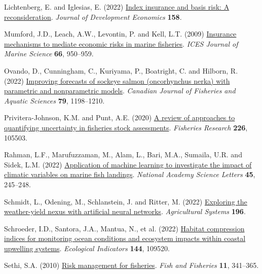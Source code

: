 \documentclass[
  letterpaper,
  DIV=11,
  numbers=noendperiod]{scrartcl}
\newlength{\cslhangindent}
\newlength{\cslentryspacingunit} %
\newenvironment{CSLReferences}[2] %
 {%
  \setlength{\parindent}{0pt}
  \ifodd #1
  \let\oldpar\par
  \def\par{\hangindent=\cslhangindent\oldpar}
  \fi
  \setlength{\parskip}{#2\cslentryspacingunit}
 }%
 {}
\begin{document}
\begin{CSLReferences}{1}{0}
\leavevmode{}%
Lichtenberg, E. and Iglesias, E. (2022)
\href{https://doi.org/10.1016/j.jdeveco.2022.102883}{Index insurance and
basis risk: A reconsideration}. \emph{Journal of Development Economics}
\textbf{158}.

\leavevmode{}%
Mumford, J.D., Leach, A.W., Levontin, P. and Kell, L.T. (2009)
\href{https://doi.org/10.1093/icesjms/fsp100}{Insurance mechanisms to
mediate economic risks in marine fisheries}. \emph{ICES Journal of
Marine Science} \textbf{66}, 950--959.

\leavevmode{}%
Ovando, D., Cunningham, C., Kuriyama, P., Boatright, C. and Hilborn, R.
(2022) \href{https://doi.org/10.1139/cjfas-2021-0287}{Improving
forecasts of sockeye salmon (oncorhynchus nerka) with parametric and
nonparametric models}. \emph{Canadian Journal of Fisheries and Aquatic
Sciences} \textbf{79}, 1198--1210.

\leavevmode{}%
Privitera-Johnson, K.M. and Punt, A.E. (2020)
\href{https://doi.org/10.1016/j.fishres.2020.105503}{A review of
approaches to quantifying uncertainty in fisheries stock assessments}.
\emph{Fisheries Research} \textbf{226}, 105503.

\leavevmode{}%
Rahman, L.F., Marufuzzaman, M., Alam, L., Bari, M.A., Sumaila, U.R. and
Sidek, L.M. (2022)
\href{https://doi.org/10.1007/s40009-022-01110-0}{Application of machine
learning to investigate the impact of climatic variables on marine fish
landings}. \emph{National Academy Science Letters} \textbf{45},
245--248.

\leavevmode{}%
Schmidt, L., Odening, M., Schlanstein, J. and Ritter, M. (2022)
\href{https://doi.org/10.1016/J.AGSY.2021.103345}{Exploring the
weather-yield nexus with artificial neural networks}. \emph{Agricultural
Systems} \textbf{196}.

\leavevmode{}%
Schroeder, I.D., Santora, J.A., Mantua, N., et al. (2022)
\href{https://doi.org/10.1016/j.ecolind.2022.109520}{Habitat compression
indices for monitoring ocean conditions and ecosystem impacts within
coastal upwelling systems}. \emph{Ecological Indicators} \textbf{144},
109520.

\leavevmode{}%
Sethi, S.A. (2010)
\href{https://doi.org/10.1111/j.1467-2979.2010.00363.x}{Risk management
for fisheries}. \emph{Fish and Fisheries} \textbf{11}, 341--365.


\end{CSLReferences}
\end{document}
